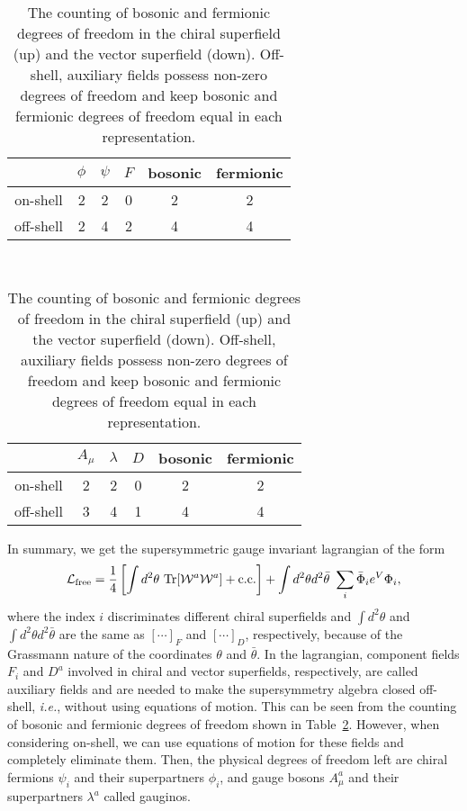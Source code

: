 \documentclass[12pt,twoside,book]{article}
\begin{document}
\begin{table}[t]
  \centering
  \begin{tabular}{c|ccc|cc}
    & $\phi$ & $\psi$ & $F$ & bosonic & fermionic \\ \hline
    on-shell & 2 & 2 & 0 & 2 & 2 \\
    off-shell & 2 & 4 & 2 & 4 & 4 \\
  \end{tabular} \\ \vspace{5mm}
  \begin{tabular}{c|ccc|cc}
    & $A_\mu$ & $\lambda$ & $D$ & bosonic & fermionic \\ \hline
    on-shell & 2 & 2 & 0 & 2 & 2 \\
    off-shell & 3 & 4 & 1 & 4 & 4 \\
  \end{tabular}
  \caption{
    The counting of bosonic and fermionic degrees of freedom in the chiral superfield (up) and the vector superfield (down).
    Off-shell, auxiliary fields possess non-zero degrees of freedom and keep bosonic and fermionic degrees of freedom equal in each representation.
  }
  \label{tab:counting}
\end{table}

In summary, we get the supersymmetric gauge invariant lagrangian of the form
\begin{align}
 \mathcal{L}_{\rm free} = \frac{1}{4} \left[ \int d^2 \theta\ {\rm Tr}
 [\mathcal{W}^a \mathcal{W}^a] + {\rm c.c.} \right] + \int d^2 \theta
 d^2 \bar{\theta}\ \sum_{i} \bar{\Phi}_i e^V
 \Phi_i,\label{freelagrangian}
\end{align}
where the index $i$ discriminates different chiral superfields and $\int d^2 \theta$ and $\int d^2 \theta d^2 \bar{\theta}$ are the same as $[\cdots ]_F$ and $[\cdots ]_D$, respectively, because of the Grassmann nature of the coordinates $\theta$ and $\bar{\theta}$.
In the lagrangian, component fields $F_i$ and $D^a$ involved in chiral and vector superfields, respectively, are called auxiliary fields and are needed to make the supersymmetry algebra closed off-shell, \textit{i.e.}, without using equations of motion.
This can be seen from the counting of bosonic and fermionic degrees of freedom shown in Table~\ref{tab:counting}.
However, when considering on-shell, we can use equations of motion for these fields and completely eliminate them.
Then, the physical degrees of freedom left are chiral fermions $\psi_i$ and their superpartners $\phi_i$, and gauge bosons $A_\mu^a$ and their superpartners $\lambda^a$ called gauginos.
\end{document}
